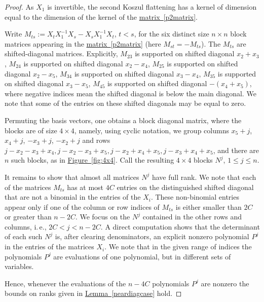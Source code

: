\documentclass[11pt]{article}
\newcommand{\expref}[2]{\texorpdfstring{\hyperref[#2]{#1~\ref{#2}}}{#1~\ref{#2}}}
\newcommand{\expeqref}[2]{\texorpdfstring{\hyperref[#2]{#1~\eqref{#2}}}{#1~\eqref{#2}}}
\newcommand{\ie}{i.\,e.}
\begin{document}
\begin{proof}
As $X_1$ is invertible, the second Koszul flattening 
has a kernel of dimension equal to the dimension of the kernel  of
the \expeqref{matrix}{p2matrix}.  %

Write $M_{ts}:=X_tX_1^{-1} X_s-X_sX_1^{-1}X_t$, $t<s$, for the six  distinct  size $n\times n$
block matrices appearing in
the \expeqref{matrix}{p2matrix} %
(here $M_{st}=-M_{ts}$). 
The $M_{ts}$   are 
%
 shifted-diagonal
matrices. Explicitly, $M_{23}$ is supported on 
%
 shifted diagonal $x_2+x_3$,
$M_{24}$ is supported on 
%
 shifted diagonal $x_2-x_4$, $M_{25}$ is supported on   %
 shifted  
 diagonal $x_2-x_5$,
$M_{34}$ is supported on 
%
 shifted 
 diagonal $x_3-x_4$, $M_{35}$ is supported on 
 shifted 
 diagonal $x_3-x_5$,
$M_{45}$ is supported on 
%
 shifted
 diagonal $-(x_4+x_5)$,
where negative indices mean the 
%
shifted 
diagonal is below the main diagonal. We note that some of the entries on these 
%
 shifted
 diagonals may be equal to zero.

Permuting the basis vectors, one obtains a  block diagonal matrix, where the blocks are
of size $4\times 4$, namely, using cyclic notation, we group columns
$x_5+j$, $x_4+j$, $-x_3+j$, $-x_2+j$
and rows $j-x_2-x_3+x_4,j-x_2-x_3+x_5,j-x_2+x_4+x_5,j-x_3+x_4+x_5$, and there are $n$ such blocks, as in \expref{Figure}{fig:4x4}.
Call the resulting $4\times 4$  blocks $N^j$, $1\leq j\leq n$.

It remains to show
that  %
almost all matrices $N^j$ have full rank. We note that each of the matrices $M_{ts}$ has at most $4C$ entries on the distinguished 
%
shifted 
diagonal that are not a binomial in the entries of %
the $X_i$.  %
These non-binomial entries appear only if one of the column or row indices of $M_{ts}$ is either smaller than $2C$ or greater than $n-2C$. We focus on 
%
the $N^j$   %
%
contained in the other rows and columns, \ie, $2C<j<n-2C$. A direct computation shows that the determinant of each such $N^j$ is, after clearing denominators, an explicit nonzero polynomial $P^j$ in the entries of the matrices $X_i$. We note that in the given range of indices the polynomials $P^j$ are evaluations of one polynomial, but in different sets of variables.

Hence, whenever the evaluations of the $n-4C$  polynomials $P^j$ are nonzero
the bounds on ranks given in \expref{Lemma}{neardiagcase} hold.  
\end{proof}
\end{document}
